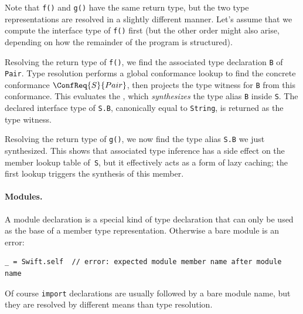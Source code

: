 \documentclass[../generics]{subfiles}
\begin{document}
Note that \texttt{f()} and \texttt{g()} have the same return type, but the two type representations are resolved in a slightly different manner. Let's assume that we compute the interface type of \texttt{f()} first (but the other order might also arise, depending on how the remainder of the program is structured).

Resolving the return type of \texttt{f()}, we find the associated type declaration \texttt{B} of \texttt{Pair}. Type resolution performs a global conformance lookup to find the concrete conformance $\ConfReq{S}{Pair}$, then projects the type witness for \texttt{B} from this conformance. This evaluates the , which \emph{synthesizes} the type alias \texttt{B} inside \texttt{S}. The declared interface type of \texttt{S.B}, canonically equal to \texttt{String}, is returned as the type witness.

Resolving the return type of \texttt{g()}, we now find the type alias \texttt{S.B} we just synthesized. This shows that associated type inference has a side effect on the member lookup table of~\texttt{S}, but it effectively acts as a form of lazy caching; the first lookup triggers the synthesis of this member.

\paragraph{Modules.}
A module declaration is a special kind of type declaration that can only be used as the base of a member type representation. Otherwise a bare module is an error:
\begin{Verbatim}
_ = Swift.self  // error: expected module member name after module name
\end{Verbatim}
Of course \texttt{import} declarations are usually followed by a bare module name, but they are resolved by different means than type resolution.
\end{document}
